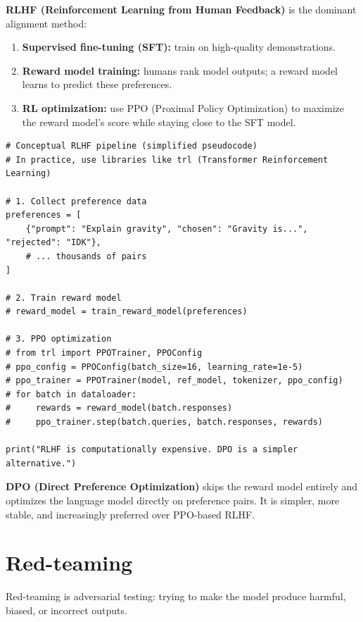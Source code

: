 \textbf{RLHF (Reinforcement Learning from Human Feedback)} is the dominant alignment method:
\begin{enumerate}
  \item \textbf{Supervised fine-tuning (SFT):} train on high-quality demonstrations.
  \item \textbf{Reward model training:} humans rank model outputs; a reward model learns to predict these preferences.
  \item \textbf{RL optimization:} use PPO (Proximal Policy Optimization) to maximize the reward model's score while staying close to the SFT model.
\end{enumerate}

\begin{verbatim}
# Conceptual RLHF pipeline (simplified pseudocode)
# In practice, use libraries like trl (Transformer Reinforcement Learning)

# 1. Collect preference data
preferences = [
    {"prompt": "Explain gravity", "chosen": "Gravity is...", "rejected": "IDK"},
    # ... thousands of pairs
]

# 2. Train reward model
# reward_model = train_reward_model(preferences)

# 3. PPO optimization
# from trl import PPOTrainer, PPOConfig
# ppo_config = PPOConfig(batch_size=16, learning_rate=1e-5)
# ppo_trainer = PPOTrainer(model, ref_model, tokenizer, ppo_config)
# for batch in dataloader:
#     rewards = reward_model(batch.responses)
#     ppo_trainer.step(batch.queries, batch.responses, rewards)

print("RLHF is computationally expensive. DPO is a simpler alternative.")
\end{verbatim}

\begin{aitip}
\textbf{DPO (Direct Preference Optimization)} skips the reward model entirely and optimizes the language model directly on preference pairs. It is simpler, more stable, and increasingly preferred over PPO-based RLHF.
\end{aitip}

\section{Red-teaming}

Red-teaming is adversarial testing: trying to make the model produce harmful, biased, or incorrect outputs.

